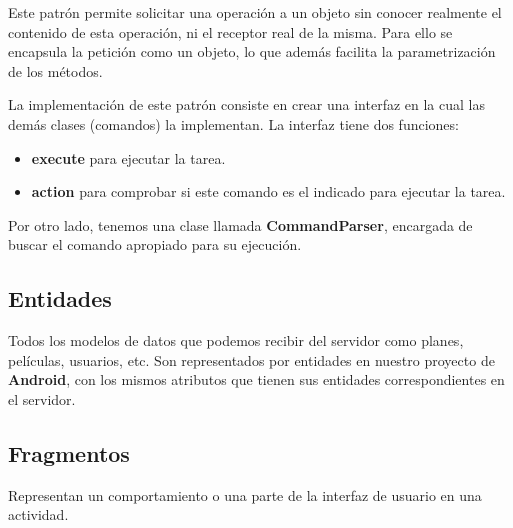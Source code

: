 Este patrón permite solicitar una operación a un objeto sin conocer realmente el contenido de esta operación, ni el receptor real de la misma. Para ello se encapsula la petición como un objeto, lo que además facilita la parametrización de los métodos.

La implementación de este patrón consiste en crear una interfaz en la cual las demás clases (comandos) la implementan. La interfaz tiene dos funciones: 
\begin{itemize}
    \item  \textbf{execute} para ejecutar la tarea.
    \item  \textbf{action} para comprobar si este comando es el indicado para ejecutar la tarea. 
\end{itemize} 
Por otro lado, tenemos una clase llamada \textbf{CommandParser}, encargada de buscar el comando apropiado para su ejecución.

\subsection{Entidades}
\label{makereference4.3.4}
Todos los modelos de datos que podemos recibir del servidor como planes, películas, usuarios, etc. Son representados por entidades en nuestro proyecto de \textbf{Android}, con los mismos atributos que tienen sus entidades correspondientes en el servidor.

\subsection{Fragmentos}
\label{makereference4.3.5}
Representan un comportamiento o una parte de la interfaz de usuario en una actividad.

